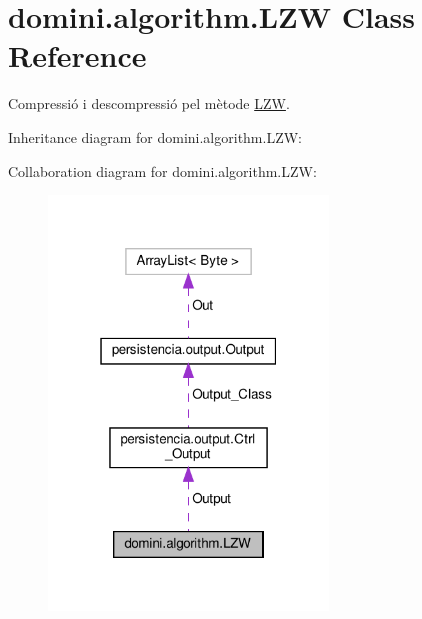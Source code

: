 \hypertarget{classdomini_1_1algorithm_1_1LZW}{}\section{domini.\+algorithm.\+L\+ZW Class Reference}
\label{classdomini_1_1algorithm_1_1LZW}


Compressió i descompressió pel mètode \hyperlink{classdomini_1_1algorithm_1_1LZW}{L\+ZW}.  




Inheritance diagram for domini.\+algorithm.\+L\+ZW\+:


Collaboration diagram for domini.\+algorithm.\+L\+ZW\+:\nopagebreak
\begin{figure}[H]
\begin{center}
\leavevmode
\includegraphics[width=211pt]{classdomini_1_1algorithm_1_1LZW__coll__graph}
\end{center}
\end{figure}
